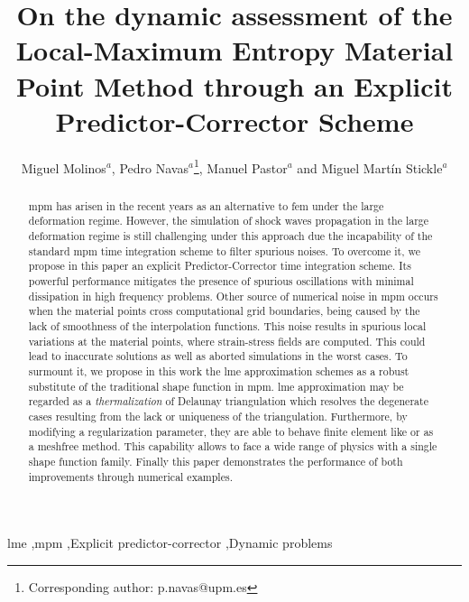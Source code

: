 \documentclass[preprint,12pt,a4paper]{elsarticle}
\begin{document}
 

\begin{frontmatter}

\title{On the dynamic assessment of the Local-Maximum Entropy Material Point Method through an Explicit Predictor-Corrector Scheme}

\author{
Miguel Molinos$^a$,
Pedro Navas$^a$\footnote{Corresponding author: p.navas@upm.es},
Manuel Pastor$^a$
and Miguel Mart\'in Stickle$^a$}
\address{
  $^a$ ETSI Caminos, Canales y Puertos, Universidad Polit\'ectnica de Madrid.\\ c. Prof. Aranguren 3, 28040 Madrid, Spain
}

\begin{abstract}
  \acrfull{mpm} has arisen in the recent years as an
  alternative to \acrfull{fem} under the large
  deformation regime. However, the simulation of shock waves
  propagation in the large deformation regime is still challenging
  under this approach due the incapability of the standard \acrshort{mpm} time
  integration scheme to filter spurious noises. To overcome it, we propose in this paper an explicit Predictor-Corrector time
    integration scheme. Its powerful performance mitigates the
  presence of spurious oscillations with minimal dissipation in high
  frequency problems. Other source of numerical noise in
  \acrshort{mpm} occurs when the material points cross computational grid boundaries, being caused by
  the lack of smoothness of the interpolation functions. This noise
  results in spurious local variations at the material points, where
  strain-stress fields are computed. This could lead to inaccurate
  solutions as well as aborted simulations in the worst cases. To
  surmount it, we propose in this work the \acrfull{lme} approximation
  schemes as a robust substitute of the traditional shape function in
  \acrshort{mpm}. \acrshort{lme} approximation may be regarded as a
  \textit{thermalization} of Delaunay triangulation which resolves the
  degenerate cases resulting from the lack or uniqueness of the
  triangulation. Furthermore, by modifying a regularization parameter,
  they are able to behave finite element like or as a meshfree
  method. This capability allows to face a wide range of physics
  with a single shape function family. Finally this paper demonstrates
  the performance of both improvements through numerical examples.    
\end{abstract}

\begin{keyword}
  \acrshort{lme} \sep \acrshort{mpm} \sep Explicit predictor-corrector \sep Dynamic problems
\end{keyword}


\end{frontmatter}
\end{document}
